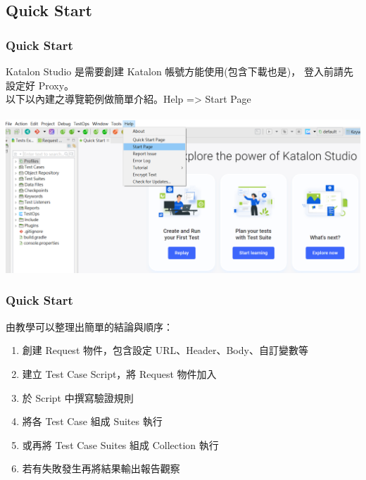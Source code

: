 \documentclass{beamer}
\begin{document}
\subsection{Quick Start}
\begin{frame}
    \frametitle{Quick Start}
    Katalon Studio 是需要創建 Katalon 帳號方能使用(包含下載也是)，
    登入前請先設定好 Proxy。~\\
    以下以內建之導覽範例做簡單介紹。Help => Start Page ~\\~\\
    \includegraphics[width=1\textwidth]{picture/quickStart.png}
\end{frame}
\begin{frame}
    \frametitle{Quick Start}
    由教學可以整理出簡單的結論與順序：
    \begin{enumerate}
        \item 創建 Request 物件，包含設定 URL、Header、Body、自訂變數等
        \item 建立 Test Case Script，將 Request 物件加入
        \item 於 Script 中撰寫驗證規則
        \item 將各 Test Case 組成 Suites 執行
        \item 或再將 Test Case Suites 組成 Collection 執行
        \item 若有失敗發生再將結果輸出報告觀察
    \end{enumerate}
\end{frame}
\ifx\allfiles\undefined
\end{document}
